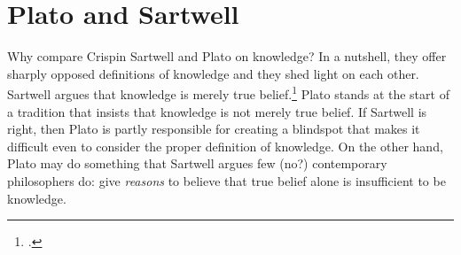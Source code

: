 \section{Plato and Sartwell}


Why compare Crispin Sartwell and Plato on knowledge? In a nutshell, they offer sharply opposed definitions of knowledge and they shed light on each other. Sartwell argues that knowledge is merely true belief.\footcite{sartwell1991, sartwell1992} Plato stands at the start of a tradition that insists that knowledge is not merely true belief. If Sartwell is right, then Plato is partly responsible for creating a blindspot that makes it difficult even to consider the proper definition of knowledge. On the other hand, Plato may do something that Sartwell argues few (no?) contemporary philosophers do: give \textit{reasons} to believe that true belief alone is insufficient to be knowledge.
